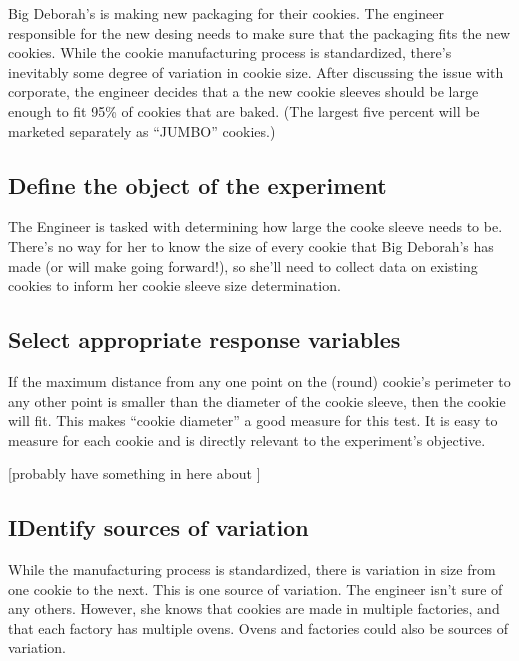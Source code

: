 \documentclass[
]{book}
\theoremstyle{definition}
\theoremstyle{definition}
\theoremstyle{definition}
\theoremstyle{remark}
\begin{document}
Big Deborah's is making new packaging for their cookies. The engineer responsible for the new desing needs to make sure that the packaging fits the new cookies. While the cookie manufacturing process is standardized, there's inevitably some degree of variation in cookie size. After discussing the issue with corporate, the engineer decides that a the new cookie sleeves should be large enough to fit 95\% of cookies that are baked. (The largest five percent will be marketed separately as ``JUMBO'' cookies.)

\hypertarget{define-the-object-of-the-experiment}{%
\subsection{Define the object of the experiment}\label{define-the-object-of-the-experiment}}

The Engineer is tasked with determining how large the cooke sleeve needs to be. There's no way for her to know the size of every cookie that Big Deborah's has made (or will make going forward!), so she'll need to collect data on existing cookies to inform her cookie sleeve size determination.

\hypertarget{select-appropriate-response-variables}{%
\subsection{Select appropriate response variables}\label{select-appropriate-response-variables}}

If the maximum distance from any one point on the (round) cookie's perimeter to any other point is smaller than the diameter of the cookie sleeve, then the cookie will fit. This makes ``cookie diameter'' a good measure for this test. It is easy to measure for each cookie and is directly relevant to the experiment's objective.

{[}probably have something in here about {]}

\hypertarget{identify-sources-of-variation}{%
\subsection{IDentify sources of variation}\label{identify-sources-of-variation}}

While the manufacturing process is standardized, there is variation in size from one cookie to the next. This is one source of variation. The engineer isn't sure of any others. However, she knows that cookies are made in multiple factories, and that each factory has multiple ovens. Ovens and factories could also be sources of variation.
\end{document}
